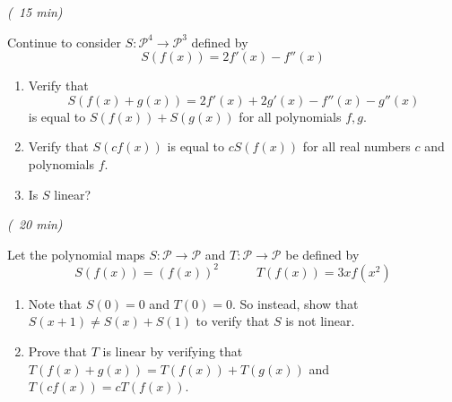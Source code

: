 \documentclass[10pt,]{book}
\theoremstyle{ptxplainnotitle}
\theoremstyle{ptxplaintitle}
\theoremstyle{ptxdefinitionnotitle}
\theoremstyle{ptxdefinitiontitle}
\theoremstyle{ptxdefinitionnotitle}
\theoremstyle{ptxdefinitiontitle}
\theoremstyle{ptxdefinitionnotitle}
\theoremstyle{ptxdefinitiontitle}
\theoremstyle{ptxdefinitionnotitle}
\theoremstyle{ptxdefinitiontitle}
\newcommand{\Poly}{\mathcal{P}}
\begin{document}
\begin{activity}\label{activity-3}
\hypertarget{p-28}{}%
\emph{(~15 min)}%
\par
\hypertarget{p-29}{}%
Continue to consider \(S: \Poly^4 \rightarrow \Poly^3\) defined by%
%
\begin{equation*}
S(f(x)) = 2f'(x)-f''(x)
\end{equation*}
\begin{enumerate}[font=\bfseries,label=(\alph*),ref=\alph*]
\item\label{task-1} \hypertarget{p-30}{}%
Verify that%
\begin{equation*}
S(f(x)+g(x))=2f'(x)+2g'(x)-f''(x)-g''(x)
\end{equation*}
is equal to \(S(f(x))+S(g(x))\) for all polynomials \(f,g\).%
\item\label{task-2} \hypertarget{p-31}{}%
Verify that \(S(cf(x))\) is equal to \(cS(f(x))\) for all real numbers \(c\) and polynomials \(f\).%
\item\label{task-3} \hypertarget{p-32}{}%
Is \(S\) linear?%
\end{enumerate}
\end{activity}
\begin{activity}\label{activity-4}
\hypertarget{p-33}{}%
\emph{(~20 min)}%
\par
\hypertarget{p-34}{}%
Let the polynomial maps \(S: \Poly \rightarrow \Poly\) and \(T: \Poly \rightarrow \Poly\) be defined by%
%
\begin{equation*}
S(f(x)) = (f(x))^2 \hspace{3em} T(f(x)) = 3xf(x^2)
\end{equation*}
\begin{enumerate}[font=\bfseries,label=(\alph*),ref=\alph*]
\item\label{task-4} \hypertarget{p-35}{}%
Note that \(S(0)=0\) and \(T(0)=0\). So instead, show that \(S(x+1)\not= S(x)+S(1)\) to verify that \(S\) is not linear.%
\item\label{task-5} \hypertarget{p-36}{}%
Prove that \(T\) is linear by verifying that \(T(f(x)+g(x))=T(f(x))+T(g(x))\) and \(T(cf(x))=cT(f(x))\).%
\end{enumerate}
\end{activity}
\end{document}
